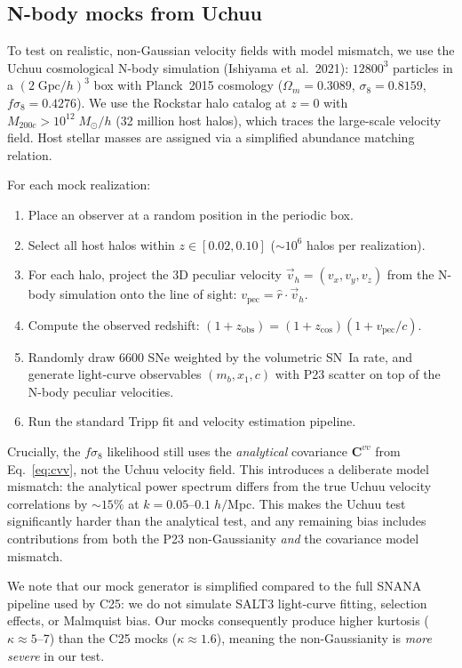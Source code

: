 \documentclass[fleqn,usenatbib]{mnras}
\begin{document}
\subsection{N-body mocks from Uchuu}
\label{sec:uchuu}

To test on realistic, non-Gaussian velocity fields with model
mismatch, we use the Uchuu cosmological N-body simulation
(Ishiyama et al.\ 2021): $12800^3$ particles in a
$(2\;\mathrm{Gpc}/h)^3$ box with Planck~2015 cosmology
($\Omega_m = 0.3089$, $\sigma_8 = 0.8159$,
$f\sigma_8 = 0.4276$). We use the Rockstar halo catalog at
$z = 0$ with $M_{200c} > 10^{12}\;M_\odot/h$ (32 million host
halos), which traces the large-scale velocity field. Host stellar
masses are assigned via a simplified abundance matching relation.

For each mock realization:
\begin{enumerate}
\item Place an observer at a random position in the periodic box.
\item Select all host halos within $z \in [0.02, 0.10]$
($\sim 10^6$ halos per realization).
\item For each halo, project the 3D peculiar velocity
$\vec{v}_h = (v_x, v_y, v_z)$ from the N-body simulation onto
the line of sight:
$v_\mathrm{pec} = \hat{r} \cdot \vec{v}_h$.
\item Compute the observed redshift:
$(1{+}z_\mathrm{obs}) = (1{+}z_\mathrm{cos})(1{+}v_\mathrm{pec}/c)$.
\item Randomly draw 6600 SNe weighted by the volumetric SN~Ia
rate, and generate light-curve observables $(m_b, x_1, c)$ with
P23 scatter on top of the N-body peculiar velocities.
\item Run the standard Tripp fit and velocity estimation pipeline.
\end{enumerate}

Crucially, the $f\sigma_8$ likelihood still uses the
\emph{analytical} covariance $\bm{C}^{vv}$ from Eq.~\ref{eq:cvv},
not the Uchuu velocity field. This introduces a deliberate model
mismatch: the analytical power spectrum differs from the true
Uchuu velocity correlations by $\sim 15\%$ at
$k = 0.05$--$0.1\;h/$Mpc. This makes the Uchuu test
significantly harder than the analytical test, and any remaining
bias includes contributions from both the P23 non-Gaussianity
\emph{and} the covariance model mismatch.

We note that our mock generator is simplified compared to the
full SNANA pipeline used by C25: we do not simulate SALT3
light-curve fitting, selection effects, or Malmquist bias. Our
mocks consequently produce higher kurtosis ($\kappa \approx 5$--7)
than the C25 mocks ($\kappa \approx 1.6$), meaning the
non-Gaussianity is \emph{more severe} in our test.
\end{document}

